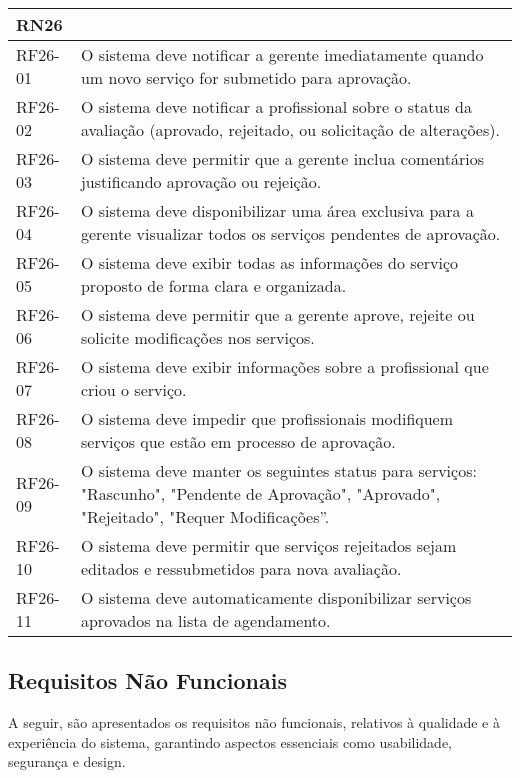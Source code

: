 \begin{longtable}{|p{}|p{}|}
	\multicolumn{2}{|l|}{\textbf{RN26}} \\ \hline
	RF26-01 & O sistema deve notificar a gerente imediatamente quando um novo serviço for submetido para aprovação. \\ \hline
	RF26-02 & O sistema deve notificar a profissional sobre o status da avaliação (aprovado, rejeitado, ou solicitação de alterações). \\ \hline
	RF26-03 & O sistema deve permitir que a gerente inclua comentários justificando aprovação ou rejeição. \\ \hline
	RF26-04 & O sistema deve disponibilizar uma área exclusiva para a gerente visualizar todos os serviços pendentes de aprovação. \\ \hline
	RF26-05 & O sistema deve exibir todas as informações do serviço proposto de forma clara e organizada. \\ \hline
	RF26-06 & O sistema deve permitir que a gerente aprove, rejeite ou solicite modificações nos serviços. \\ \hline
	RF26-07 & O sistema deve exibir informações sobre a profissional que criou o serviço. \\ \hline
	RF26-08 & O sistema deve impedir que profissionais modifiquem serviços que estão em processo de aprovação. \\ \hline
	RF26-09 & O sistema deve manter os seguintes status para serviços: "Rascunho", "Pendente de Aprovação", "Aprovado", "Rejeitado", "Requer Modificações”. \\ \hline
	RF26-10 & O sistema deve permitir que serviços rejeitados sejam editados e ressubmetidos para nova avaliação. \\ \hline
	RF26-11 & O sistema deve automaticamente disponibilizar serviços aprovados na lista de agendamento. \\ \hline
	

\end{longtable}



\subsection{Requisitos Não Funcionais}

A seguir, são apresentados os requisitos não funcionais, relativos à qualidade e à experiência do sistema, garantindo aspectos essenciais como usabilidade, segurança e design.

